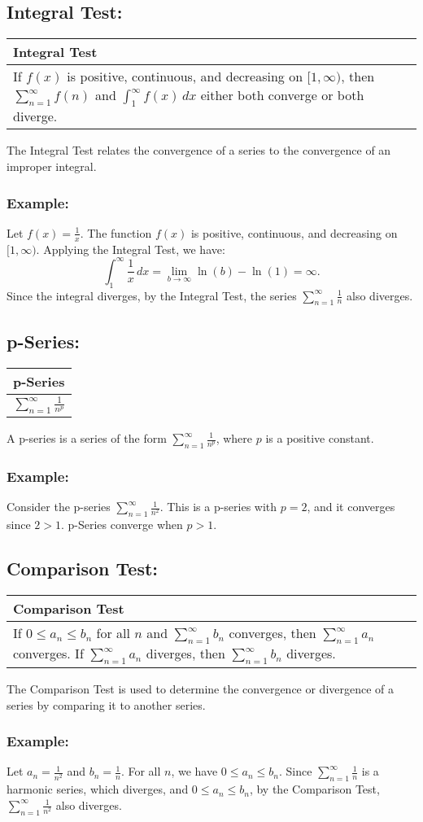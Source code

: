 \documentclass[12pt]{article}
\newcommand{\formula}[2]{
    {\renewcommand{\arraystretch}{2}
        \begin{center}
        \begin{tabular}{|p{0.9\textwidth}|}
        \hline
        \textbf{#1} \\
        \hline
        #2 \\
        \hline
        \end{tabular}
        \end{center}
    }
}
\begin{document}
\subsection{Integral Test: }
\formula{Integral Test}{
    If $f(x)$ is positive, continuous, and decreasing on $[1, \infty)$, then $\sum_{n=1}^{\infty} f(n)$ and $\int_{1}^{\infty} f(x) \,dx$ either both converge or both diverge.
}
The Integral Test relates the convergence of a series to the convergence of an improper integral.
\subsubsection{Example: }
Let $f(x) = \frac{1}{x}$. The function $f(x)$ is positive, continuous, and decreasing on $[1, \infty)$. Applying the Integral Test, we have:
\[
\int_{1}^{\infty} \frac{1}{x} \,dx = \lim_{b \to \infty} \ln(b) - \ln(1) = \infty.
\]
Since the integral diverges, by the Integral Test, the series $\sum_{n=1}^{\infty} \frac{1}{n}$ also diverges.

\vspace{\baselineskip}

\subsection{p-Series: }
\formula{p-Series}{
    $\sum_{n=1}^{\infty} \frac{1}{n^p}$
}
A p-series is a series of the form $\sum_{n=1}^{\infty} \frac{1}{n^p}$, where $p$ is a positive constant.
\subsubsection{Example: }
Consider the p-series $\sum_{n=1}^{\infty} \frac{1}{n^2}$. This is a p-series with $p = 2$, and it converges since $2 > 1$. p-Series converge when $p > 1$.

\vspace{\baselineskip}

\subsection{Comparison Test: }
\formula{Comparison Test}{
    If $0 \leq a_n \leq b_n$ for all $n$ and $\sum_{n=1}^{\infty} b_n$ converges, then $\sum_{n=1}^{\infty} a_n$ converges. If $\sum_{n=1}^{\infty} a_n$ diverges, then $\sum_{n=1}^{\infty} b_n$ diverges.
}
The Comparison Test is used to determine the convergence or divergence of a series by comparing it to another series.
\subsubsection{Example: }
Let $a_n = \frac{1}{n^2}$ and $b_n = \frac{1}{n}$. For all $n$, we have $0 \leq a_n \leq b_n$. Since $\sum_{n=1}^{\infty} \frac{1}{n}$ is a harmonic series, which diverges, and $0 \leq a_n \leq b_n$, by the Comparison Test, $\sum_{n=1}^{\infty} \frac{1}{n^2}$ also diverges.
\end{document}
